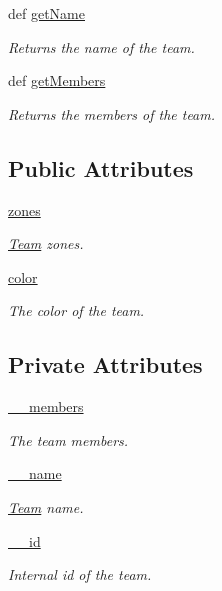 \begin{DoxyCompactItemize}
def \hyperlink{class_team_1_1_team_a06d36a2882160f497f1bc88e316980bb}{getName}
\begin{DoxyCompactList}\small\item\em Returns the name of the team. \item\end{DoxyCompactList}\item 
def \hyperlink{class_team_1_1_team_ae6d70c611129f89288dd984db448f87c}{getMembers}
\begin{DoxyCompactList}\small\item\em Returns the members of the team. \item\end{DoxyCompactList}\end{DoxyCompactItemize}
\subsection*{Public Attributes}
\begin{DoxyCompactItemize}
\item 
\hyperlink{class_team_1_1_team_a585395bf34a71843cffaf71626138ab4}{zones}
\begin{DoxyCompactList}\small\item\em \hyperlink{class_team_1_1_team}{Team} zones. \item\end{DoxyCompactList}\item 
\hyperlink{class_team_1_1_team_ac98394f815e38111f61f85d60a124459}{color}
\begin{DoxyCompactList}\small\item\em The color of the team. \item\end{DoxyCompactList}\end{DoxyCompactItemize}
\subsection*{Private Attributes}
\begin{DoxyCompactItemize}
\item 
\hyperlink{class_team_1_1_team_a5298a0b6a24b1c1245690a39b1b83d19}{\_\-\_\-members}
\begin{DoxyCompactList}\small\item\em The team members. \item\end{DoxyCompactList}\item 
\hyperlink{class_team_1_1_team_aa840b5c614936ab0ceb8c9a041fd63d3}{\_\-\_\-name}
\begin{DoxyCompactList}\small\item\em \hyperlink{class_team_1_1_team}{Team} name. \item\end{DoxyCompactList}\item 
\hyperlink{class_team_1_1_team_a7ce63ee4a4004c0248fd10694054f459}{\_\-\_\-id}
\begin{DoxyCompactList}\small\item\em Internal id of the team. \item\end{DoxyCompactList}\end{DoxyCompactItemize}
